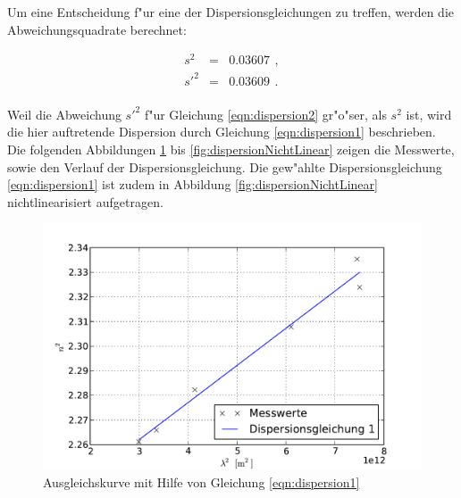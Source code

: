 
		Um eine Entscheidung f"ur eine der Dispersionsgleichungen zu treffen, werden die Abweichungsquadrate berechnet:

		\begin{eqnarray*}
			s^2 & = & \SI{0.03607}{} \,, \\
			s'^2 & = & \SI{0.03609}{} \,. \\
		\end{eqnarray*}

		Weil die Abweichung $s'^2$ f"ur Gleichung \eqref{eqn:dispersion2} gr"o"ser, als $s^2$ ist, wird die hier auftretende Dispersion durch Gleichung \eqref{eqn:dispersion1} beschrieben.
		Die folgenden Abbildungen \ref{fig:dispersion1} bis \ref{fig:dispersionNichtLinear} zeigen die Messwerte, sowie den Verlauf der Dispersionsgleichung.
		Die gew"ahlte Dispersionsgleichung \eqref{eqn:dispersion1} ist zudem in Abbildung \ref{fig:dispersionNichtLinear} nichtlinearisiert aufgetragen.

		\begin{figure}[h]
			\centering
			\includegraphics[width = 15cm]{img/dispersion1.pdf}
			\caption{Ausgleichskurve mit Hilfe von Gleichung \eqref{eqn:dispersion1} \label{fig:dispersion1}}
		\end{figure}

